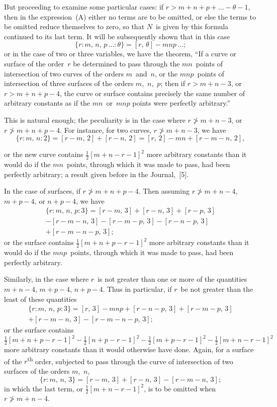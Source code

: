 \documentclass[11pt,a4paper]{article}
\begin{document}
But proceeding to examine some particular cases: if $r > m+n+p+\ldots - \theta - 1$, then in the expression~(A) either no terms are to be omitted, or else the terms to be omitted reduce themselves to zero, so that $N$~is given by this formula continued to its last term. It will be subsequently shown that in this case
\[
\{r : m,\, n,\, p\, \ldots : \theta\} = [r,\,\theta] - mnp\, \ldots;
\]
or in the case of two or three variables, we have the theorem, ``If a curve or surface of the order~$r$ be determined to pass through the $mn$~points of intersection of two curves of the orders $m$~and~$n$, or the $mnp$~points of intersection of three surfaces of the orders $m$,~$n$,~$p$; then if $r > m+n-3$, or $r > m+n+p-4$, the curve or surface contains precisely the same number of arbitrary constants as if the $mn$~or~$mnp$ points were perfectly arbitrary.''

This is natural enough; the peculiarity is in the case where $r \ngtr m+n-3$, or $r \ngtr m+n+p-4$. For instance, for two curves, $r \ngtr m+n-3$, we have
\[
\{r : m,\, n : 2\} = [r-m,\,2] + [r-n,\,2] = [r,\,2] - mn + [r-m-n,\,2],
\]

\newpage
or the new curve contains $\frac{1}{2}[m+n-r-1]^2$ more arbitrary constants than it would do if the $mn$~points, through which it was made to pass, had been perfectly arbitrary; a result given before in the Journal,~[5].

In the case of surfaces, if $r \ngtr m+n+p-4$. Then assuming $r \ngtr m+n-4$, $m+p-4$, or $n+p-4$, we have
\begin{multline*}
\{r : m,\, n,\, p : 3\} = [r-m,\,3] + [r-n,\,3] + [r-p,\,3] \\
- [r-m-n,\,3] - [r-m-p,\,3] - [r-n-p,\,3] \\
+ [r-m-n-p,\,3];
\end{multline*}
or the surface contains $\frac{1}{2}[m+n+p-r-1]^2$ more arbitrary constants than it would do if the $mnp$~points, through which it was made to pass, had been perfectly arbitrary.

Similarly, in the case where $r$~is not greater than one or more of the quantities $m+n-4$, $m+p-4$, $n+p-4$. Thus in particular, if $r$~be not greater than the least of these quantities
\begin{multline*}
\{r : m,\, n,\, p : 3\} = [r,\,3] - mnp + [r-n-p,\,3] + [r-m-p,\,3] \\
+ [r-m-n,\,3] - [r-m-n-p,\,3];
\end{multline*}
or the surface contains
\[
\tfrac{1}{2}[m+n+p-r-1]^2 - \tfrac{1}{2}[n+p-r-1]^2 - \tfrac{1}{2}[m+p-r-1]^2 - \tfrac{1}{2}[m+n-r-1]^2
\]
more arbitrary constants than it would otherwise have done. Again, for a surface of the $r$\textsuperscript{th} order, subjected to pass through the curve of intersection of two surfaces of the orders $m$,~$n$,
\[
\{r : m,\, n,\, 3\} = [r-m,\,3] + [r-n,\,3] - [r-m-n,\,3];
\]
in which the last term, or $\frac{1}{2}[m+n-r-1]^2$, is to be omitted when $r \ngtr m+n-4$.
\end{document}
